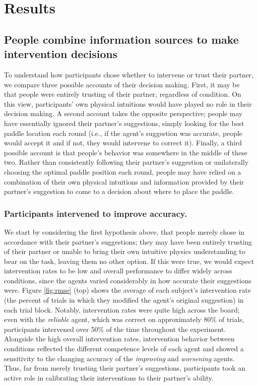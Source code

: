 \documentclass[10pt,letterpaper]{article}
\begin{document}
\section{Results}

\subsection{People combine information sources to make intervention decisions}

To understand how participants chose whether to intervene or trust their partner, we compare three possible accounts of their decision making. First, it may be that people were entirely trusting of their partner, regardless of condition. On this view, participants' own physical intuitions would have played no role in their decision making. A second account takes the opposite perspective; people may have essentially ignored their partner's suggestions, simply looking for the best paddle location each round (i.e., if the agent's suggestion was accurate, people would accept it and if not, they would intervene to correct it). Finally, a third possible account is that people's behavior was somewhere in the middle of these two. Rather than consistently following their partner's suggestion or unilaterally choosing the optimal paddle position each round, people may have relied on a combination of their own physical intuitions and information provided by their partner's suggestion to come to a decision about where to place the paddle. 

\subsubsection{Participants intervened to improve accuracy.} We start by considering the first hypothesis above, that people merely chose in accordance with their partner's suggestions; they may have been entirely trusting of their partner or unable to bring their own intuitive physics understanding to bear on the task, leaving them no other option. If this were true, we would expect intervention rates to be low and overall performance to differ widely across conditions, since the agents varied considerably in how accurate their suggestions were. Figure \ref{fig:rmse} (top) shows the average of each subject's intervention rate (the percent of trials in which they modified the agent's original suggestion) in each trial block. Notably, intervention rates were quite high across the board; even with the \textit{reliable} agent, which was correct on approximately 80\% of trials, participants intervened over 50\% of the time throughout the experiment. Alongside the high overall intervention rates, intervention behavior between conditions reflected the different competence levels of each agent and showed a sensitivity to the changing accuracy of the \textit{improving} and \textit{worsening} agents. Thus, far from merely trusting their partner's suggestions, participants took an active role in calibrating their interventions to their partner's ability.
\end{document}
